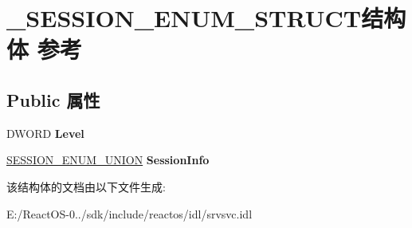 \hypertarget{struct___s_e_s_s_i_o_n___e_n_u_m___s_t_r_u_c_t}{}\section{\+\_\+\+S\+E\+S\+S\+I\+O\+N\+\_\+\+E\+N\+U\+M\+\_\+\+S\+T\+R\+U\+C\+T结构体 参考}
\label{struct___s_e_s_s_i_o_n___e_n_u_m___s_t_r_u_c_t}
\subsection*{Public 属性}
\begin{DoxyCompactItemize}
\item 
\mbox{\label{struct___s_e_s_s_i_o_n___e_n_u_m___s_t_r_u_c_t_abd967f7123d63da5877f1aabf0ef2720}} 
D\+W\+O\+RD {\bfseries Level}
\item 
\mbox{\label{struct___s_e_s_s_i_o_n___e_n_u_m___s_t_r_u_c_t_afc293462bc829aa4f9881e15d551d182}} 
\hyperlink{union___s_e_s_s_i_o_n___e_n_u_m___u_n_i_o_n}{S\+E\+S\+S\+I\+O\+N\+\_\+\+E\+N\+U\+M\+\_\+\+U\+N\+I\+ON} {\bfseries Session\+Info}
\end{DoxyCompactItemize}


该结构体的文档由以下文件生成\+:\begin{DoxyCompactItemize}
\item 
E\+:/\+React\+O\+S-\/0../sdk/include/reactos/idl/srvsvc.\+idl\end{DoxyCompactItemize}
